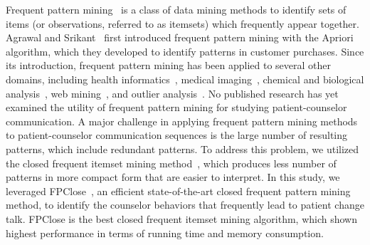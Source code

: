 Frequent pattern mining~\cite{aggarwal2014frequent} is a class of data mining methods to identify sets of items (or observations, referred to as itemsets) which frequently appear together. Agrawal and Srikant~\cite{agrawal1994fast} first introduced frequent pattern mining with the Apriori algorithm, which they developed to identify patterns in customer purchases. Since its introduction, frequent pattern mining has been applied to several other domains, including health informatics~\cite{abdullah2008analysis, olukunle2002fast, bethel2006mining, wright2015use}, medical imaging~\cite{olukunle2002fast}, chemical and biological analysis~\cite{deshpande2005frequent, leach2007introduction, zhang2008discovering}, web mining~\cite{srivastava2000web}, and outlier analysis~\cite{aggarwal2015outlier}. No published research has yet examined the utility of frequent pattern mining for studying patient-counselor communication. A major challenge in applying frequent pattern mining methods to patient-counselor communication sequences is the large number of resulting patterns, which include redundant patterns. To address this problem, we utilized the closed frequent itemset mining method~\cite{pasquier1999discovering}, which produces less number of patterns in more compact form that are easier to interpret. In this study, we leveraged FPClose~\cite{grahne2005fast}, an efficient state-of-the-art closed frequent pattern mining method, to identify the counselor behaviors that frequently lead to patient change talk. FPClose is the best closed frequent itemset mining algorithm, which shown highest performance in terms of running time and memory consumption.

